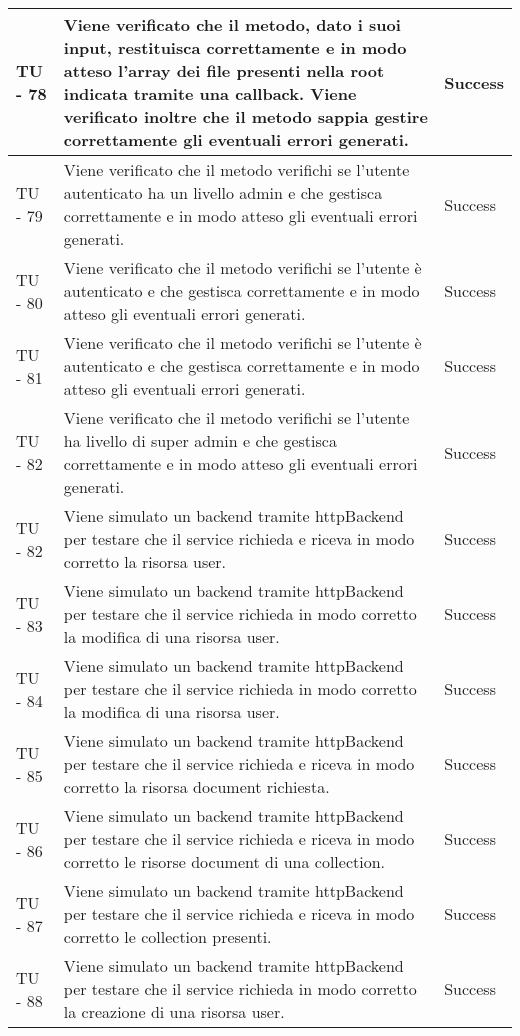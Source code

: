 \begin{center}
\begin{longtable}{ | p{3cm} | p{9cm} | p{2cm} | }
TU - 78 & Viene verificato che il metodo, dato i suoi input, restituisca correttamente e in modo atteso l'array dei file presenti nella root indicata tramite una callback. Viene verificato inoltre che il metodo sappia gestire correttamente gli eventuali errori generati. & Success \\ \hline
TU - 79 & Viene verificato che il metodo verifichi se l'utente autenticato ha un livello admin e che gestisca correttamente e in modo atteso gli eventuali errori generati. & Success \\ \hline
TU - 80 & Viene verificato che il metodo verifichi se l'utente è autenticato e che gestisca correttamente e in modo atteso gli eventuali errori generati. & Success \\ \hline
TU - 81 & Viene verificato che il metodo verifichi se l'utente è autenticato e che gestisca correttamente e in modo atteso gli eventuali errori generati. & Success \\ \hline
TU - 82 & Viene verificato che il metodo verifichi se l'utente ha livello di super admin e che gestisca correttamente e in modo atteso gli eventuali errori generati. & Success \\ \hline
TU - 82 & Viene simulato un backend tramite httpBackend per testare che il service richieda e riceva in modo corretto la risorsa user. & Success \\ \hline
TU - 83 & Viene simulato un backend tramite httpBackend per testare che il service richieda in modo corretto la modifica di una risorsa user. & Success \\ \hline
TU - 84 & Viene simulato un backend tramite httpBackend per testare che il service richieda in modo corretto la modifica di una risorsa user. & Success \\ \hline
TU - 85 & Viene simulato un backend tramite httpBackend per testare che il service richieda e riceva in modo corretto la risorsa document richiesta. & Success \\ \hline
TU - 86 & Viene simulato un backend tramite httpBackend per testare che il service richieda e riceva in modo corretto le risorse document di una collection. & Success \\ \hline
TU - 87 & Viene simulato un backend tramite httpBackend per testare che il service richieda e riceva in modo corretto le collection presenti. & Success \\ \hline
TU - 88 & Viene simulato un backend tramite httpBackend per testare che il service richieda in modo corretto la creazione di una risorsa user. & Success \\ \hline

\end{longtable}
\end{center}
